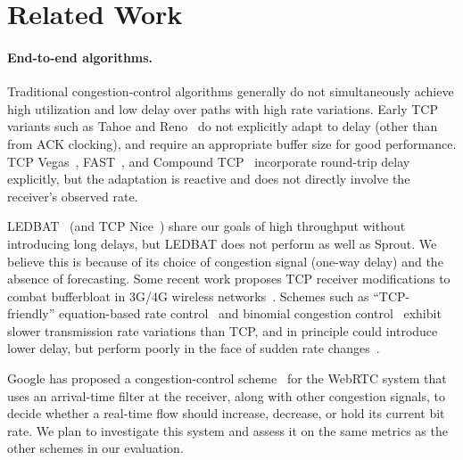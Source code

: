 \section{Related Work}
\label{s:related}

\paragraph{End-to-end algorithms.}

Traditional congestion-control algorithms generally do not
simultaneously achieve high utilization and low delay over paths with
high rate variations.
Early TCP variants such as Tahoe and Reno~\cite{Jacobson88} do not
explicitly adapt to delay (other than from ACK clocking), and require
an appropriate buffer size for good performance. TCP
Vegas~\cite{Brakmo94}, FAST~\cite{FAST}, and Compound TCP~\cite{CTCP}
incorporate round-trip delay explicitly, but the adaptation is
reactive and does not directly involve the receiver's observed rate.

LEDBAT~\cite{ledbat} (and TCP Nice~\cite{tcpnice}) share our goals of
high throughput without introducing long delays, but LEDBAT does not
perform as well as Sprout. We believe this is because of its choice of
congestion signal (one-way delay) and the absence of forecasting.
Some recent work proposes TCP receiver modifications to combat
bufferbloat in 3G/4G wireless networks~\cite{tcpbufferbloat}.
Schemes such as ``TCP-friendly'' equation-based
rate control~\cite{ebcc} and binomial congestion
control~\cite{binomial} exhibit slower transmission rate variations
than TCP, and in principle could introduce lower delay, but perform
poorly in the face of sudden rate changes~\cite{slowcc-dynamic}.

Google has proposed a congestion-control scheme~\cite{WebRTCdraft} for
the WebRTC system that uses an arrival-time filter at the receiver,
along with other congestion signals, to decide whether a real-time
flow should increase, decrease, or hold its current bit rate. We plan
to investigate this system and assess it on the same metrics as the
other schemes in our evaluation.

